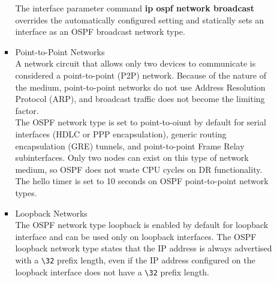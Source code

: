 \documentclass{article}
\begin{document}
\begin{itemize}
\begin{itemize}
\begin{itemize}
						The interface parameter command \textbf{ip ospf network broadcast} overrides the automatically configured setting and statically sets an interface as an OSPF broadcast network type.
					\item Point-to-Point Networks\\
						A network circuit that allows only two devices to communicate is considered a point-to-point (P2P) network. Because of the nature of the medium, point-to-point networks do not use Address Resolution Protocol (ARP), and broadcast traffic does not become the limiting factor.\\

						The OSPF network type is set to point-to-oiunt by default for serial interfaces (HDLC or PPP encapsulation), generic routing encapsulation (GRE) tunnels, and point-to-point Frame Relay subinterfaces. Only two nodes can exist on this type of network medium, so OSPF does not waste CPU cycles on DR functionality. The hello timer is set to 10 seconds on OSPF point-to-point network types.
					\item Loopback Networks\\
						The OSPF network type loopback is enabled by default for loopback interface and can be used only on loopback interfaces. The OSPF loopback network type states that the IP address is always advertised with a \verb|\32| prefix length, even if the IP address configured on the loopback interface does not have a \verb|\32| prefix length.
				\end{itemize}
		\end{itemize}
\end{itemize}
\end{document}
